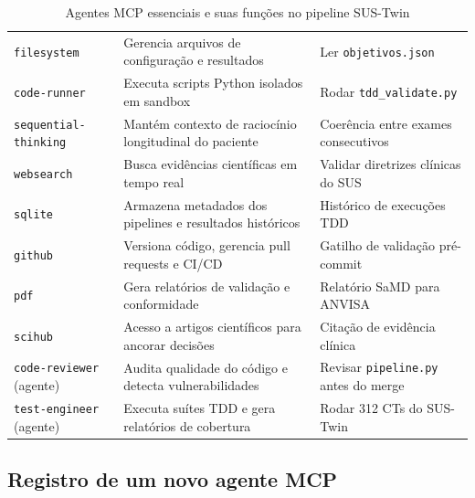 \begin{table}[ht]
\centering
\caption{Agentes MCP essenciais e suas funções no pipeline SUS-Twin}
\label{tab:opencode-mcp-sustwin}
\begin{tabular}{LLL}
\toprule
{} &  &  \\
\midrule
\texttt{filesystem} & Gerencia arquivos de configuração
  e resultados & Ler \texttt{objetivos.json} \\
\texttt{code-runner} & Executa scripts Python isolados
  em sandbox\footnotemark & Rodar \texttt{tdd\_validate.py} \\
\texttt{sequential-thinking} & Mantém contexto de raciocínio
  longitudinal do paciente & Coerência entre exames
  consecutivos \\
\texttt{websearch} & Busca evidências científicas
  em tempo real & Validar diretrizes clínicas
  do SUS \\
\texttt{sqlite} & Armazena metadados dos pipelines
  e resultados históricos & Histórico de execuções
  TDD \\
\texttt{github} & Versiona código, gerencia
  pull requests e CI/CD & Gatilho de validação
  pré-commit \\
\texttt{pdf} & Gera relatórios de validação
  e conformidade & Relatório SaMD
  para ANVISA \\
\texttt{scihub} & Acesso a artigos científicos
  para ancorar decisões & Citação de
  evidência clínica \\
\midrule
\texttt{code-reviewer} (agente) & Audita qualidade do código
  e detecta vulnerabilidades & Revisar \texttt{pipeline.py}
  antes do merge \\
\texttt{test-engineer} (agente) & Executa suítes TDD e
  gera relatórios de cobertura\footnotemark & Rodar 312 CTs
  do SUS-Twin \\
\bottomrule
\end{tabular}
\end{table}

\subsection{Registro de um novo agente MCP}

